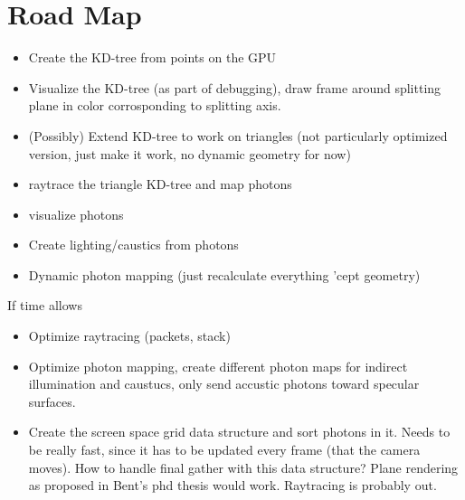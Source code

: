 \chapter{Road Map}

\begin{itemize}
\item Create the KD-tree from points on the GPU
\item Visualize the KD-tree (as part of debugging), draw frame around
  splitting plane in color corrosponding to splitting axis.
\item (Possibly) Extend KD-tree to work on triangles (not particularly optimized
  version, just make it work, no dynamic geometry for now)
\item raytrace the triangle KD-tree and map photons
\item visualize photons
\item Create lighting/caustics from photons
\item Dynamic photon mapping (just recalculate everything 'cept geometry)
\end{itemize}

If time allows

\begin{itemize}
\item Optimize raytracing (packets, stack)
\item Optimize photon mapping, create different photon maps for
  indirect illumination and caustucs, only send accustic photons
  toward specular surfaces.
\item Create the screen space grid data structure and sort photons in
  it. Needs to be really fast, since it has to be updated every frame
  (that the camera moves). How to handle final gather with this data
  structure? Plane rendering as proposed in Bent's phd thesis would
  work. Raytracing is probably out.
\end{itemize}

